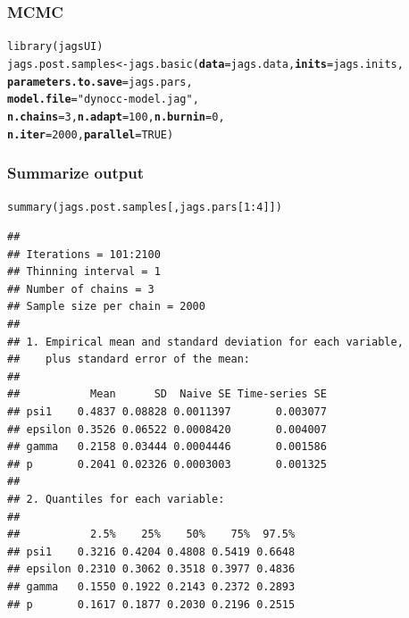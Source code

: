\documentclass[color=usenames,dvipsnames,handout]{beamer}\usepackage[]{graphicx}\usepackage[]{xcolor}
\makeatletter
\newcommand{\hlnum}[1]{\textcolor[rgb]{0.69,0.494,0}{#1}}%
\newcommand{\hlsng}[1]{\textcolor[rgb]{0.749,0.012,0.012}{#1}}%
\newcommand{\hlopt}[1]{\textcolor[rgb]{0,0,0}{#1}}%
\newcommand{\hldef}[1]{\textcolor[rgb]{0,0,0}{#1}}%
\newcommand{\hlkwb}[1]{\textcolor[rgb]{0,0.341,0.682}{#1}}%
\newcommand{\hlkwc}[1]{\textcolor[rgb]{0,0,0}{\textbf{#1}}}%
\newcommand{\hlkwd}[1]{\textcolor[rgb]{0.004,0.004,0.506}{#1}}%
\newenvironment{kframe}{%
 \def\at@end@of@kframe{}%
 \ifinner\ifhmode%
  \def\at@end@of@kframe{\end{minipage}}%
  \begin{minipage}{\columnwidth}%
 \fi\fi%
 \def\FrameCommand##1{\hskip\@totalleftmargin \hskip-\fboxsep
 \colorbox{shadecolor}{##1}\hskip-\fboxsep
     \hskip-\linewidth \hskip-\@totalleftmargin \hskip\columnwidth}%
 \MakeFramed {\advance\hsize-\width
   \@totalleftmargin\z@ \linewidth\hsize
   \@setminipage}}%
 {\par\unskip\endMakeFramed%
 \at@end@of@kframe}
\newenvironment{knitrout}{}{} %
\makeatother
\begin{document}
\begin{frame}[fragile]
  \frametitle{MCMC}
  \small
\begin{knitrout}\scriptsize
{}\color{fgcolor}\begin{kframe}
\begin{alltt}
\hlkwd{library}\hldef{(jagsUI)}
\hldef{jags.post.samples} \hlkwb{<-} \hlkwd{jags.basic}\hldef{(}\hlkwc{data}\hldef{=jags.data,} \hlkwc{inits}\hldef{=jags.inits,}
                                \hlkwc{parameters.to.save}\hldef{=jags.pars,}
                                \hlkwc{model.file}\hldef{=}\hlsng{"dynocc-model.jag"}\hldef{,}
                                \hlkwc{n.chains}\hldef{=}\hlnum{3}\hldef{,} \hlkwc{n.adapt}\hldef{=}\hlnum{100}\hldef{,} \hlkwc{n.burnin}\hldef{=}\hlnum{0}\hldef{,}
                                \hlkwc{n.iter}\hldef{=}\hlnum{2000}\hldef{,} \hlkwc{parallel}\hldef{=}\hlnum{TRUE}\hldef{)}
\end{alltt}
\end{kframe}
\end{knitrout}
\end{frame}



\begin{frame}[fragile]
  \frametitle{Summarize output}
\begin{knitrout}\tiny
{}\color{fgcolor}\begin{kframe}
\begin{alltt}
\hlkwd{summary}\hldef{(jags.post.samples[,jags.pars[}\hlnum{1}\hlopt{:}\hlnum{4}\hldef{]])}
\end{alltt}
\begin{verbatim}
## 
## Iterations = 101:2100
## Thinning interval = 1 
## Number of chains = 3 
## Sample size per chain = 2000 
## 
## 1. Empirical mean and standard deviation for each variable,
##    plus standard error of the mean:
## 
##           Mean      SD  Naive SE Time-series SE
## psi1    0.4837 0.08828 0.0011397       0.003077
## epsilon 0.3526 0.06522 0.0008420       0.004007
## gamma   0.2158 0.03444 0.0004446       0.001586
## p       0.2041 0.02326 0.0003003       0.001325
## 
## 2. Quantiles for each variable:
## 
##           2.5%    25%    50%    75%  97.5%
## psi1    0.3216 0.4204 0.4808 0.5419 0.6648
## epsilon 0.2310 0.3062 0.3518 0.3977 0.4836
## gamma   0.1550 0.1922 0.2143 0.2372 0.2893
## p       0.1617 0.1877 0.2030 0.2196 0.2515
\end{verbatim}
\end{kframe}
\end{knitrout}
\end{frame}
\end{document}
